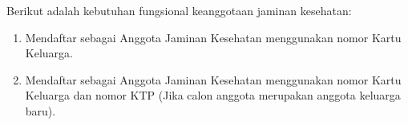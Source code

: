 Berikut adalah kebutuhan fungsional keanggotaan jaminan kesehatan:
\begin{enumerate}
	\item Mendaftar sebagai Anggota Jaminan Kesehatan menggunakan nomor Kartu Keluarga.
	\item Mendaftar sebagai Anggota Jaminan Kesehatan menggunakan nomor Kartu Keluarga dan nomor KTP (Jika calon anggota merupakan anggota keluarga baru).
\end{enumerate}